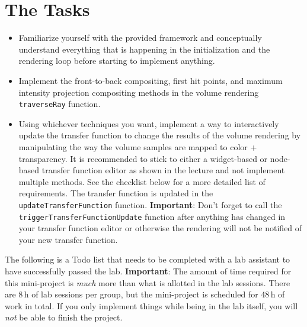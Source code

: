 \documentclass{labinstructions}
\begin{document}
\section{The Tasks}
\begin{itemize}
  \item Familiarize yourself with the provided framework and conceptually understand everything that is happening in the initialization and the rendering loop before starting to implement anything.
  \item Implement the front-to-back compositing, first hit points, and maximum intensity projection compositing methods in the volume rendering \texttt{traverseRay} function.
  \item Using whichever techniques you want, implement a way to interactively update the transfer function to change the results of the volume rendering by manipulating the way the volume samples are mapped to color + transparency.  It is recommended to stick to either a widget-based or node-based transfer function editor as shown in the lecture and not implement multiple methods.  See the checklist below for a more detailed list of requirements.  The transfer function is updated in the \texttt{updateTransferFunction} function.  \textbf{Important}:  Don't forget to call the \texttt{triggerTransferFunctionUpdate} function after anything has changed in your transfer function editor or otherwise the rendering will not be notified of your new transfer function.
\end{itemize}

The following is a Todo list that needs to be completed with a lab assistant to have successfully passed the lab.  \textbf{Important}:  The amount of time required for this mini-project is \emph{much} more than what is allotted in the lab sessions.  There are 8\,h of lab sessions per group, but the mini-project is scheduled for 48\,h of work in total.  If you only implement things while being in the lab itself, you will \emph{not} be able to finish the project.
\end{document}
